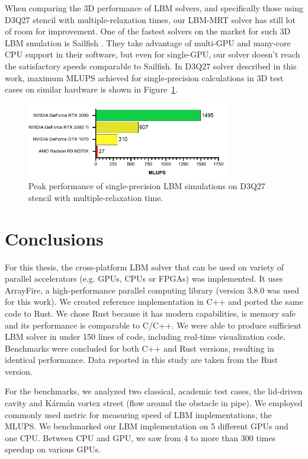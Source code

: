 When comparing the 3D performance of LBM solvers, and specifically those using D3Q27 stencil with multiple-relaxation times, our LBM-MRT solver has still lot of room for improvement. One of the fastest solvers on the market for such 3D LBM smulation is Sailfish \cite{januszewskiSailfishFlexibleMultiGPU2014}. They take advantage of multi-GPU and many-core CPU support in their software, but even for single-GPU, our solver doesn't reach the satisfactory speeds comparable to Sailfish. In D3Q27 solver described in this work, maximum MLUPS achieved for single-precision calculations in 3D test cases on similar hardware is shown in Figure~\ref{fig:max_mlups_3d}. 

\begin{figure}[!ht]
	\centering
	\includegraphics[width=0.8\textwidth]{data/max_mlups_3d.pdf}
	\caption{Peak performance of single-precision LBM simulations on D3Q27 stencil with multiple-relaxation time.}
	\label{fig:max_mlups_3d}
\end{figure}

\section{Conclusions}\label{sec:conclusion}

For this thesis, the cross-platform LBM solver that can be used on variety of parallel accelerators (e.g. GPUs, CPUs or FPGAs) was implemented. It uses ArrayFire, a high-performance parallel computing library (version 3.8.0 was used for this work). We created reference implementation in C++ and ported the same code to Rust. We chose Rust because it has modern capabilities, is memory safe and its performance is comparable to C/C++. We were able to produce sufficient LBM solver in under 150 lines of code, including real-time visualization code. Benchmarks were concluded for both C++ and Rust versions, resulting in identical performance. Data reported in this study are taken from the Rust version. 

For the benchmarks, we analyzed two classical, academic test cases, the lid-driven cavity and Kármán vortex street (flow around the obstacle in pipe). We employed commonly used metric for measuring speed of LBM implementations, the MLUPS. We benchmarked our LBM implementation on 5 different GPUs and one CPU. Between CPU and GPU, we saw from 4 to more than 300 times speedup on various GPUs.

